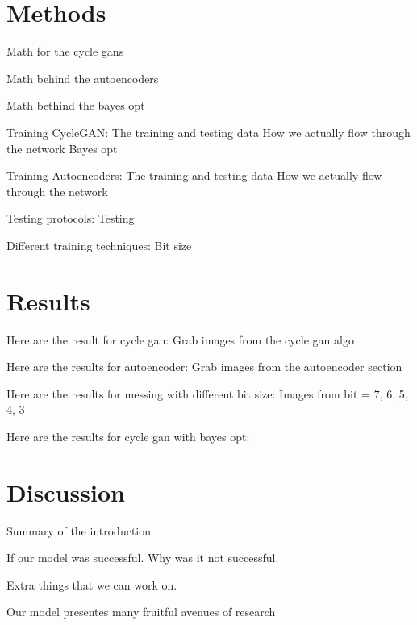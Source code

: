 \documentclass[conference]{IEEEtran}
\begin{document}
\section{Methods}

Math for the cycle gans

Math behind the autoencoders 

Math bethind the bayes opt

Training CycleGAN: 
    The training and testing data
    How we actually flow through the network 
    Bayes opt
    
Training Autoencoders:
    The training and testing data
    How we actually flow through the network
    
Testing protocols: 
    Testing
    
Different training techniques:
    Bit size

\section{Results}

Here are the result for cycle gan: 
     Grab images from the cycle gan algo

Here are the results for autoencoder:
     Grab images from the autoencoder section 
     
Here are the results for messing with different bit size:
     Images from bit = 7, 6, 5, 4, 3

Here are the results for cycle gan with bayes opt:

\section{Discussion}

Summary of the introduction 

If our model was successful. Why was it not successful. 

Extra things that we can work on. 

Our model presentes many fruitful avenues of research 


\end{document}
